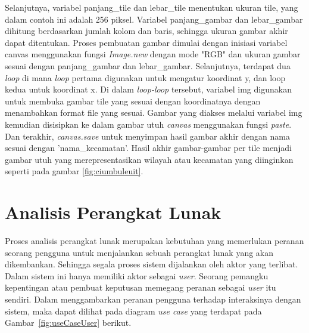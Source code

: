 Selanjutnya, variabel panjang\_tile dan lebar\_tile menentukan ukuran tile, yang dalam contoh ini adalah 256 piksel. Variabel panjang\_gambar dan lebar\_gambar dihitung berdasarkan jumlah kolom dan baris, sehingga ukuran gambar akhir dapat ditentukan. Proses pembuatan gambar  dimulai dengan inisiasi variabel canvas menggunakan fungsi \textit{Image.new }dengan mode "RGB" dan ukuran gambar sesuai dengan panjang\_gambar dan lebar\_gambar. Selanjutnya, terdapat dua \textit{loop} di mana \textit{loop} pertama digunakan untuk mengatur koordinat y, dan loop kedua untuk koordinat x. Di dalam \textit{loop-loop} tersebut, variabel img digunakan untuk membuka gambar tile yang sesuai dengan koordinatnya dengan menambahkan format file yang sesuai. Gambar yang diakses melalui variabel img kemudian disisipkan ke dalam gambar utuh \textit{canvas} menggunakan fungsi \textit{paste}. Dan terakhir, \textit{canvas.save} untuk menyimpan hasil gambar akhir dengan nama sesuai dengan 'nama\_kecamatan'. Hasil akhir gambar-gambar per tile menjadi gambar utuh yang merepresentasikan wilayah atau kecamatan yang diinginkan seperti pada gambar \ref{fig:ciumbuleuit}.


\section{Analisis Perangkat Lunak}
Proses analisis perangkat lunak merupakan kebutuhan yang memerlukan peranan seorang pengguna untuk menjalankan sebuah perangkat lunak yang akan dikembankan. Sehingga segala proses sistem dijalankan oleh aktor yang terlibat. Dalam sistem ini hanya memiliki aktor sebagai \textit{user}. Seorang pemangku kepentingan atau pembuat keputusan memegang peranan sebagai \textit{user} itu sendiri. Dalam menggambarkan peranan pengguna terhadap interaksinya dengan sistem, maka dapat dilihat pada diagram \textit{use case} yang terdapat pada Gambar~\ref{fig:useCaseUser} berikut.

